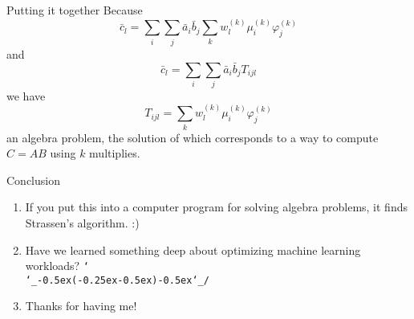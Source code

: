 \documentclass{beamer}
\def\shrug{\texttt{\raisebox{0.75em}{\char`\_}\char`\\\char`\_\kern-0.5ex(\kern-0.25ex\raisebox{0.25ex}{\rotatebox{45}{\raisebox{-.75ex}"\kern-1.5ex\rotatebox{-90})}}\kern-0.5ex)\kern-0.5ex\char`\_/\raisebox{0.75em}{\char`\_}}}
\begin{document}
\begin{frame}{Putting it together}
    Because \[
    \bar{c}_l = \sum_i\sum_j\bar{a}_i\bar{b}_j\sum_kw_l^{(k)}\mu^{(k)}_i\varphi^{(k)}_j
    \]
    and \[
    \bar{c}_l = \sum_i\sum_j\bar{a}_i\bar{b}_jT_{ijl}
    \]
    we have \[
    T_{ijl} = \sum_kw_l^{(k)}\mu^{(k)}_i\varphi^{(k)}_j
    \]
    \pause an algebra problem, the solution of which corresponds to a way to compute $C=AB$ using $k$ multiplies.
\end{frame}

\begin{frame}{Conclusion}
\begin{enumerate}
    \item If you put this into a computer program for solving algebra problems, it finds Strassen's algorithm. :) \pause
    \item Have we learned something deep about optimizing machine learning workloads? \pause \shrug
    \item \pause Thanks for having me!
\end{enumerate}
\end{frame}
\end{document}
